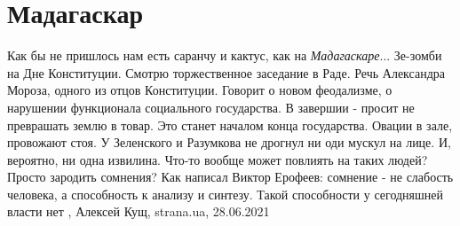  
 
 
 
 
\chapter{Мадагаскар}
\label{sec:slova.madagaskar}

Как бы не пришлось нам есть саранчу и кактус, как на \emph{Мадагаскаре}...
Зе-зомби на Дне Конституции.  Смотрю торжественное заседание в Раде.  Речь
Александра Мороза, одного из отцов Конституции.  Говорит о новом феодализме, о
нарушении функционала социального государства.  В завершии - просит не
преврашать землю в товар. Это станет началом конца государства. Овации в зале,
провожают стоя.  У Зеленского и Разумкова не дрогнул ни оди мускул на лице. И,
вероятно, ни одна извилина.  Что-то вообще может повлиять на таких людей?
Просто зародить сомнения?  Как написал Виктор Ерофеев: сомнение - не слабость
человека, а способность к анализу и синтезу.  Такой способности у сегодняшней
власти нет
, 
Алексей Кущ, strana.ua, 28.06.2021

